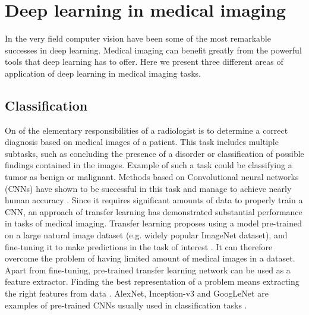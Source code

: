 \section{Deep learning in medical imaging}
In the very field computer vision have been some of the most remarkable successes in deep learning. Medical imaging can benefit greatly from the powerful tools that deep learning has to offer. Here we present three different areas of application of deep learning in medical imaging tasks.
\subsection{Classification}
On of the elementary responsibilities of a radiologist is to determine a correct diagnosis based on medical images of a patient. This task includes multiple subtasks, such as concluding the presence of a disorder or classification of possible findings contained in the images. Example of such a task could be classifying a tumor as benign or malignant. Methods based on Convolutional neural networks (CNNs) have shown to be successful in this task and manage to achieve nearly human accuracy \cite{deeplearningHealthcare}. Since it requires significant amounts of data to properly train a CNN, an approach of transfer learning has demonstrated substantial performance in tasks of medical imaging. Transfer learning proposes using a model pre-trained on a large natural image dataset (e.g. widely popular ImageNet dataset), and fine-tuning it to make predictions in the task of interest \cite{IEEEtransfer}. It can therefore overcome the problem of having limited amount of medical images in a dataset. Apart from fine-tuning, pre-trained transfer learning network can be used as a feature extractor. Finding the best representation of a problem means extracting the right features from data \cite{surveyOnImageing}. AlexNet, Inception-v3 and GoogLeNet are examples of pre-trained CNNs usually used in classification tasks \cite{IEEEtransfer}.
